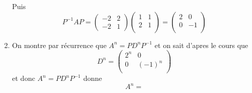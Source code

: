 \documentclass[a4paper, 11pt,reqno]{article}
\begin{document}
\begin{correction}
\begin{enumerate}
Puis $$P^{-1} A P = \begin{pmatrix}
-2&2\\
-2& 1
\end{pmatrix} \begin{pmatrix}
1 & 1\\
2 & 1\\
\end{pmatrix}= 
\begin{pmatrix}
2& 0\\
0 & -1\\
\end{pmatrix}$$
  
\item On montre par récurrence que $A^n = P D^n P^{-1}$ et  on sait d'apres le cours que 
$$D^n  =\begin{pmatrix}
2^n & 0\\
0 & (-1)^n\\
\end{pmatrix}$$
et donc $A^n = PD^n P^{-1}$ donne 
$$A^n  = $$

 \end{enumerate}
\end{correction}



\vspace{1cm}
\end{document}
